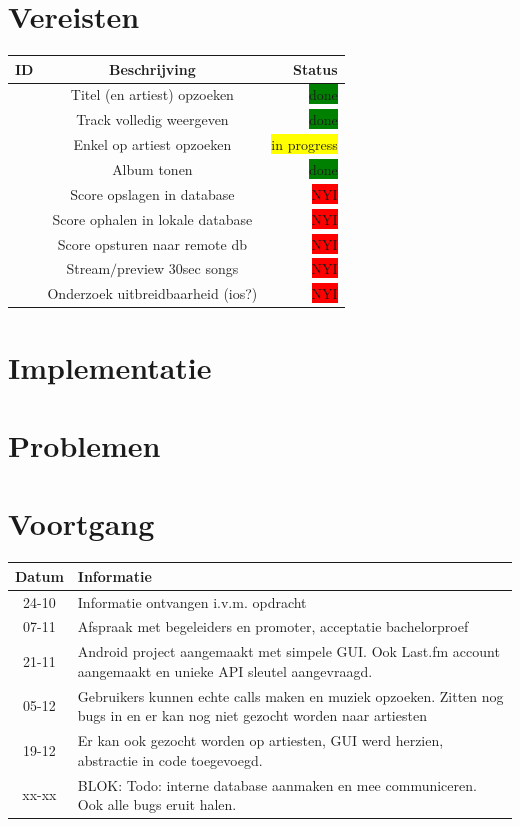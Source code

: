 \documentclass[11pt,a4paper]{article}
\newcommand{\boxgreen}{\colorbox{green}{\color{black}done}}
\newcommand{\boxyellow}{\colorbox{yellow}{\color{black}in progress}}
\newcommand{\boxred}{\colorbox{red}{\color{black}NYI}}
\newcounter{reqc}
\newcommand{\reqID} {%
   \stepcounter{reqc}%
   \thereqc}
\begin{document}
\section{Vereisten}
	\begin{tabular}{| l | c | r |}
	\hline
	ID 	& 	Beschrijving						& Status \\ \hline \hline
	\reqID	&	Titel (en artiest) opzoeken			& \boxgreen \\ \hline
	\reqID 	& 	Track volledig weergeven			& \boxgreen \\ \hline
	\reqID	& 	Enkel op artiest opzoeken 			& \boxyellow \\ \hline
	\reqID 	& 	Album tonen 						& \boxgreen \\ \hline
	\reqID	& 	Score opslagen in database 			& \boxred  \\ \hline
	\reqID 	& 	Score ophalen in lokale database 	& \boxred \\ \hline
	\reqID	& 	Score opsturen naar remote db		& \boxred \\ \hline
	\reqID	&	Stream$/$preview 30sec songs		& \boxred \\ \hline
	\reqID 	& 	Onderzoek uitbreidbaarheid (ios?)	& \boxred \\ \hline
	
	\hline	
	\end{tabular}
\section{Implementatie}
\section{Problemen}
\section{Voortgang}
	\begin{tabular}{| c | p{\linewidth} | }
	\hline
	Datum & Informatie \\ \hline \hline 
	24-10 & Informatie ontvangen i.v.m. opdracht \\ \hline
	07-11 & Afspraak met begeleiders en promoter, acceptatie bachelorproef \\ \hline
	21-11 & Android project aangemaakt met simpele GUI. Ook Last.fm account aangemaakt en unieke API sleutel aangevraagd. \\ \hline
	05-12 & Gebruikers kunnen echte calls maken en muziek opzoeken. Zitten nog bugs in en er kan nog niet gezocht worden naar artiesten \\ \hline
	19-12 & Er kan ook gezocht worden op artiesten, GUI werd herzien, abstractie in code toegevoegd. \\ \hline
	xx-xx & BLOK: Todo: interne database aanmaken en mee communiceren. Ook alle bugs eruit halen. \\ \hline
	
	\end{tabular}
\end{document}
